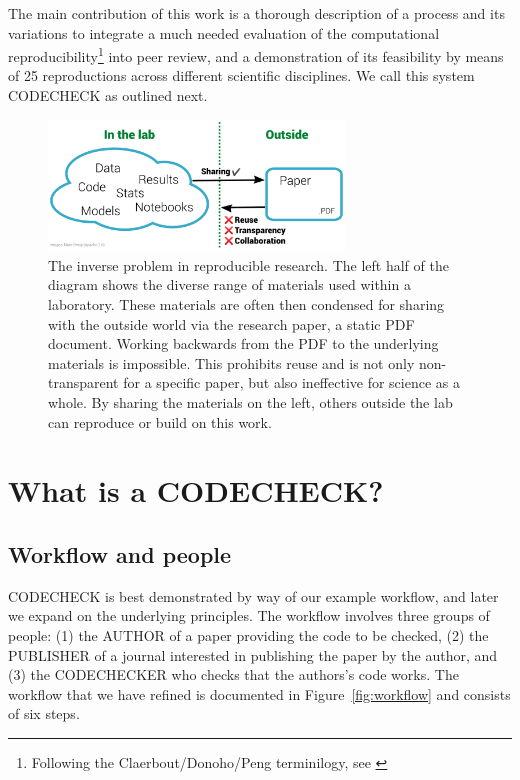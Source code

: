 \documentclass[12pt]{article}
\begin{document}
The main contribution of this work is a thorough description of a process
and its variations to integrate a much needed evaluation of the 
computational reproducibility\footnote{Following the 
Claerbout/Donoho/Peng terminilogy, see 
\cite{barba_terminologies_2018}} into peer
review, and a demonstration of its feasibility by means of 25
reproductions across different scientific disciplines.
We call this system CODECHECK as outlined next.

\begin{figure}
  \centering
  \includegraphics[width=0.7\textwidth]{figs/rr.pdf}
  \caption{The inverse problem in reproducible research.  The left
  half of the diagram shows the diverse range of materials used
  within a laboratory.  These materials are often then
  condensed for sharing with the outside world via the
  research paper, a static PDF document.  Working backwards from the
  PDF to the underlying materials is impossible. This prohibits reuse
  and is not only non-transparent for a specific paper, but also 
  ineffective for science as a whole. By sharing the
  materials on the left, others outside the lab can reproduce
  or build on this work.}
  \label{fig:inverse}
\end{figure}

\section*{What is a CODECHECK?}\label{what-is-a-codecheck}

\subsection*{Workflow and people}\label{workflow-people}

CODECHECK is best demonstrated by way of our example workflow, and later
we expand on the underlying principles. The workflow involves three
groups of people:
(1) the AUTHOR of a paper providing the code to be checked,
(2) the PUBLISHER of a journal interested in publishing the paper 
by the author, and
(3) the CODECHECKER who checks that the authors's code works.
The workflow that we have refined is documented in Figure~\ref{fig:workflow}
and consists of six steps.
\end{document}
